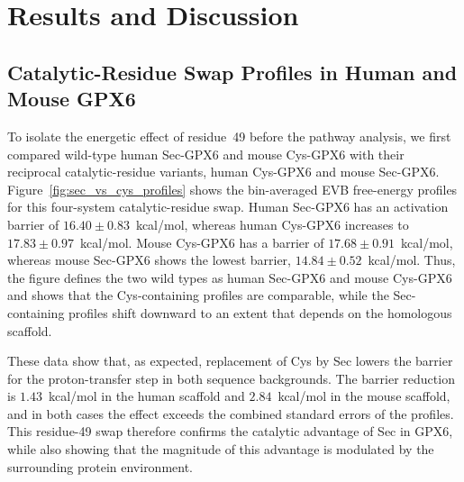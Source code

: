 \section{Results and Discussion}

\subsection{Catalytic-Residue Swap Profiles in Human and Mouse GPX6}

To isolate the energetic effect of residue~49 before the pathway analysis, we first compared wild-type human Sec-GPX6 and mouse Cys-GPX6 with their reciprocal catalytic-residue variants, human Cys-GPX6 and mouse Sec-GPX6. Figure~\ref{fig:sec_vs_cys_profiles} shows the bin-averaged EVB free-energy profiles for this four-system catalytic-residue swap. Human Sec-GPX6 has an activation barrier of $16.40 \pm 0.83$~kcal/mol, whereas human Cys-GPX6 increases to $17.83 \pm 0.97$~kcal/mol. Mouse Cys-GPX6 has a barrier of $17.68 \pm 0.91$~kcal/mol, whereas mouse Sec-GPX6 shows the lowest barrier, $14.84 \pm 0.52$~kcal/mol. Thus, the figure defines the two wild types as human Sec-GPX6 and mouse Cys-GPX6 and shows that the Cys-containing profiles are comparable, while the Sec-containing profiles shift downward to an extent that depends on the homologous scaffold.

 These data show that, as expected, replacement of Cys by Sec lowers the barrier for the proton-transfer step in both sequence backgrounds. The barrier reduction is $1.43$~kcal/mol in the human scaffold and $2.84$~kcal/mol in the mouse scaffold, and in both cases the effect exceeds the combined standard errors of the profiles. This residue-49 swap therefore confirms the catalytic advantage of Sec in GPX6, while also showing that the magnitude of this advantage is modulated by the surrounding protein environment. 

